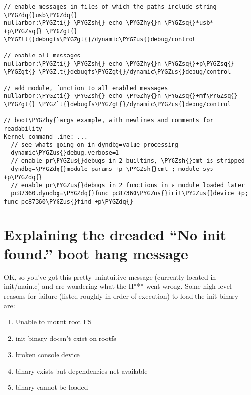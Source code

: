 \documentclass[a4paper,8pt,english]{sphinxmanual}
\def\PYGZus{\char`\_}
\def\PYGZlt{\char`\<}
\def\PYGZgt{\char`\>}
\def\PYGZsh{\char`\#}
\def\PYGZhy{\char`\-}
\def\PYGZsq{\char`\'}
\def\PYGZdq{\char`\"}
\def\PYGZti{\char`\~}
\renewcommand\PYGZsq{\textquotesingle}
\begin{document}
\begin{Verbatim}[commandchars=\\\{\}]
// enable messages in files of which the paths include string \PYGZdq{}usb\PYGZdq{}
nullarbor:\PYGZti{} \PYGZsh{} echo \PYGZhy{}n \PYGZsq{}*usb* +p\PYGZsq{} \PYGZgt{} \PYGZlt{}debugfs\PYGZgt{}/dynamic\PYGZus{}debug/control

// enable all messages
nullarbor:\PYGZti{} \PYGZsh{} echo \PYGZhy{}n \PYGZsq{}+p\PYGZsq{} \PYGZgt{} \PYGZlt{}debugfs\PYGZgt{}/dynamic\PYGZus{}debug/control

// add module, function to all enabled messages
nullarbor:\PYGZti{} \PYGZsh{} echo \PYGZhy{}n \PYGZsq{}+mf\PYGZsq{} \PYGZgt{} \PYGZlt{}debugfs\PYGZgt{}/dynamic\PYGZus{}debug/control

// boot\PYGZhy{}args example, with newlines and comments for readability
Kernel command line: ...
  // see whats going on in dyndbg=value processing
  dynamic\PYGZus{}debug.verbose=1
  // enable pr\PYGZus{}debugs in 2 builtins, \PYGZsh{}cmt is stripped
  dyndbg=\PYGZdq{}module params +p \PYGZsh{}cmt ; module sys +p\PYGZdq{}
  // enable pr\PYGZus{}debugs in 2 functions in a module loaded later
  pc87360.dyndbg=\PYGZdq{}func pc87360\PYGZus{}init\PYGZus{}device +p; func pc87360\PYGZus{}find +p\PYGZdq{}
\end{Verbatim}


\chapter{Explaining the dreaded ``No init found.'' boot hang message}
\label{admin-guide/init::doc}\label{admin-guide/init:explaining-the-dreaded-no-init-found-boot-hang-message}
OK, so you've got this pretty unintuitive message (currently located
in init/main.c) and are wondering what the H*** went wrong.
Some high-level reasons for failure (listed roughly in order of execution)
to load the init binary are:
\begin{enumerate}
\item {} 
Unable to mount root FS

\item {} 
init binary doesn't exist on rootfs

\item {} 
broken console device

\item {} 
binary exists but dependencies not available

\item {} 
binary cannot be loaded

\end{enumerate}
\end{document}
